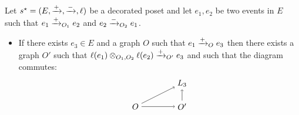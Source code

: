 \begin{lemma}
  Let $s^{\star} = (E, \mathrel{\xrightarrow{+}}, \mathrel{\xrightarrow{-}}, \ell)$ be a decorated poset and let $e_1,e_2$ be two events in $E$ such that $e_1\mathrel{\xrightarrow{+}}_{O_1} e_2$ and $e_2\mathrel{\xrightarrow{-}}_{O_2} e_1$.
  \begin{itemize}
  \item If there exists $e_3\in E$ and a graph $O$ such that $e_1\mathrel{\xrightarrow{+}}_O e_3$ then there exists a graph $O'$ such that $\ell(e_1)\otimes_{O_1,O_2} \ell(e_2)\mathrel{\xrightarrow{+}}_{O'} e_3$ and such that the diagram commutes:
    \[
    \begin{tikzpicture} %
      \node (l3) at (2,1) {\(L_3\)};
      \node (o) at (0,0) {\(O\)};
      \node (o1) at (2,0) {\(O'\)};
      \draw [->] (o) -- (o1);
      \draw [->] (o) -- (l3);
      \draw [->] (o1) -- (l3);
    \end{tikzpicture}
    \]
  \end{itemize}
\end{lemma}
